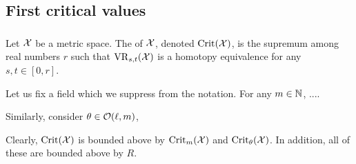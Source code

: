 
\subsection{First critical values}\label{sub:general_barcodes}


\subsubsection{}\label{subsub:first_critical_value}\label{subsub:beta v.s. fillrad}

Let \(\mathcal{X}\) be a metric space.
The  of \(\mathcal{X}\), denoted \(\operatorname{Crit}(\mathcal{X})\), is the supremum among real numbers $r$ such that $\operatorname{VR}_{s,t}(\mathcal{X})$ is a homotopy equivalence for any $s,t \in [0,r]$. 

Let us fix a field which we suppress from the notation.
For any \(m \in \mathbb{N}\), .... 

Similarly, consider \(\theta \in \mathcal{O}(\ell, m)\), 

%

Clearly, \(\operatorname{Crit}(\mathcal{X})\) is bounded above by \(\operatorname{Crit}_m(\mathcal{X})\) and \(\operatorname{Crit}_\theta(\mathcal{X})\).
In addition, all of these are bounded above by $R$. 

